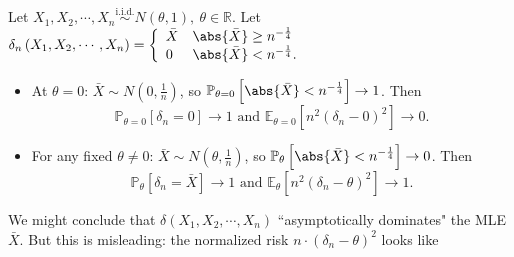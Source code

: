 \documentclass[a4paper]{article}
\begin{document}
\begin{eg}
	Let $X_1,X_2,\cdots,X_n \stackrel{\text{i.i.d.}}{\sim} N(\theta,1), \ \theta \in \mathbb{R}$. Let $\delta_n \left(X_1,X_2,\cdots,X_n\right) = \left\{\begin{array}{ll}
		\bar{X} & \abs{\bar{X}} \geq n^{-\frac{1}{4}} \\
		0 & \abs{\bar{X}} < n^{-\frac{1}{4}}.
	\end{array}\right.$
	\begin{itemize}[leftmargin=*]
		\item At $\theta = 0$: $\bar{X} \sim N(0,\frac{1}{n})$, so $\mathbb{P}_{\theta = 0} \left[\abs{\bar{X}} < n^{-\frac{1}{4}}\right] \to 1$. Then
		\begin{equation*}
			\mathbb{P}_{\theta = 0} \left[\delta_n = 0\right] \to 1 \text{ and } \mathbb{E}_{\theta = 0} \left[n^2(\delta_n - 0)^2\right] \to 0.
		\end{equation*}
		\item For any fixed $\theta \neq 0$: $\bar{X} \sim N(\theta,\frac{1}{n})$, so $\mathbb{P}_{\theta} \left[\abs{\bar{X}} < n^{-\frac{1}{4}}\right] \to 0$. Then
		\begin{equation*}
			\mathbb{P}_{\theta} \left[\delta_n = \bar{X}\right] \to 1 \text{ and } \mathbb{E}_{\theta} \left[n^2(\delta_n - \theta)^2\right] \to 1.
		\end{equation*}
	\end{itemize}
		We might conclude that $\delta(X_1,X_2,\cdots,X_n)$ ``asymptotically dominates" the MLE $\bar{X}$. But this is misleading: the normalized risk $n \cdot (\delta_n - \theta)^2$ looks like
	\begin{center}
\end{center}
\end{eg}
\end{document}
